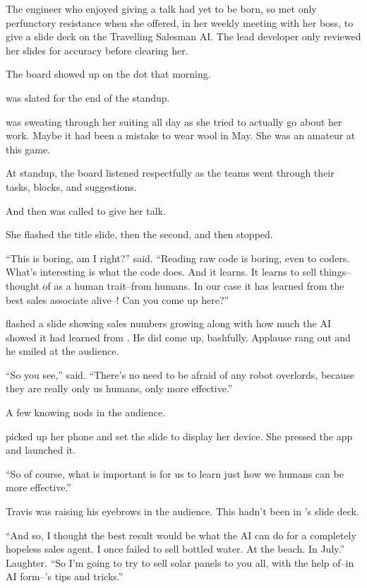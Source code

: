 The engineer who enjoyed giving a talk had yet to be born, so {\protag} met only perfunctory resistance when she offered, in her weekly meeting with her boss, to give a slide deck on the Travelling Salesman AI. The lead developer only reviewed her slides for accuracy before clearing her.

The board showed up on the dot that morning.

{\protag} was slated for the end of the standup.

{\protag} was sweating through her suiting all day as she tried to actually go about her work. Maybe it had been a mistake to wear wool in May. She was an amateur at this game.

At standup, the board listened respectfully as the teams went through their tasks, blocks, and suggestions.

And then {\protag} was called to give her talk.

She flashed the title slide, then the second, and then stopped.

``This is boring, am I right?'' {\protag} said. ``Reading raw code is boring, even to coders. What's interesting is what the code does. And it learns. It learns to sell things--thought of as a human trait--from humans. In our case it has learned from the best sales associate alive--\energyJerk{}! Can you come up here?''

{\protag} flashed a slide showing sales numbers growing along with how much the AI showed it had learned from \energyJerk{}. He did come up, bashfully. Applause rang out and he smiled at the audience.

``So you see,'' {\protag} said. ``There's no need to be afraid of any robot overlords, because they are really only us humans, only more effective.''

A few knowing nods in the audience.

{\protag} picked up her phone and set the slide to display her device. She pressed the app and launched it.

``So of course, what is important is for us to learn just how we humans can be more effective.''

Travis was raising his eyebrows in the audience. This hadn't been in {\protag}'s slide deck.

``And so, I thought the best result would be what the AI can do for a completely hopeless sales agent. I once failed to sell bottled water. At the beach. In July.'' Laughter. ``So I'm going to try to sell solar panels to you all, with the help of--in AI form--\energyJerk{}'s tips and tricks.''

